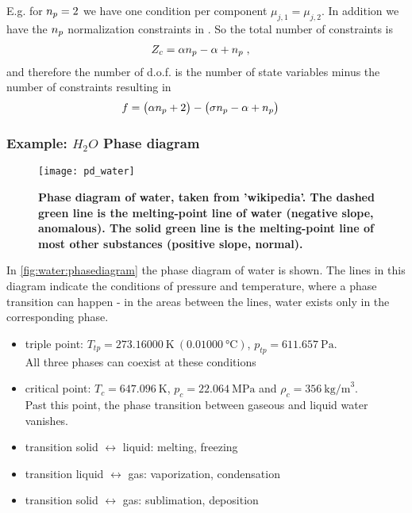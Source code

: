 E.g. for $n_{p} =2$ we have one condition per component $\mu_{j,1}=\mu_{j,2}$.
In addition we have the $n_{p} $ normalization constraints in .
So the total number of constraints is 
%
\begin{align*}
Z_{c} &= \alpha n_{p} -\alpha + n_{p} \;,
\end{align*}
%
and therefore the number of d.o.f. is the number of state variables minus the number of constraints
resulting in 
%
\begin{align*}
f &=\big( \alpha n_{p} +2\big) - \big(\sigma n_{p} -\alpha+n_{p} \big)
\end{align*}
%
%
%

\subsubsection{Example: $H_{2}O$ Phase diagram}
\begin{figure}[htbp]
\begin{center}
\texttt{[image: pd\_water]}
\caption{\bf Phase diagram of water, taken from 'wikipedia'. The dashed green line
is the melting-point line of water (negative slope, anomalous). The solid green line is the melting-point line of most other substances (positive slope, normal).}
\label{fig:water:phasediagram}
\end{center}
\end{figure}

In \autoref{fig:water:phasediagram} the phase diagram of water is shown. The lines in this diagram indicate the conditions of pressure and temperature, where a phase transition can happen - in the areas between the lines, water exists only in the corresponding phase. 

\begin{itemize}
	\item 
		triple point: $T_{tp}=273.16000 ~\text{K} ~(0.01000 ~\text{°C})$, $p_{tp}=611.657 ~\text{Pa}$. \\
		All three phases can coexist at these conditions
	\item
		critical point: $T_{c} = 647.096 ~\text{K}$, $p_{c} = 22.064 ~\text{MPa}$ and $\rho_{c} = 356 ~\text{kg/m}^{3}$. \\
		Past this point, the phase transition between gaseous and liquid water vanishes.
	\item 
		transition solid $\leftrightarrow$ liquid: melting, freezing 
 	\item 
		transition liquid $\leftrightarrow$ gas:  vaporization, condensation
 	\item 
		transition solid $\leftrightarrow$ gas: sublimation, deposition
\end{itemize}

